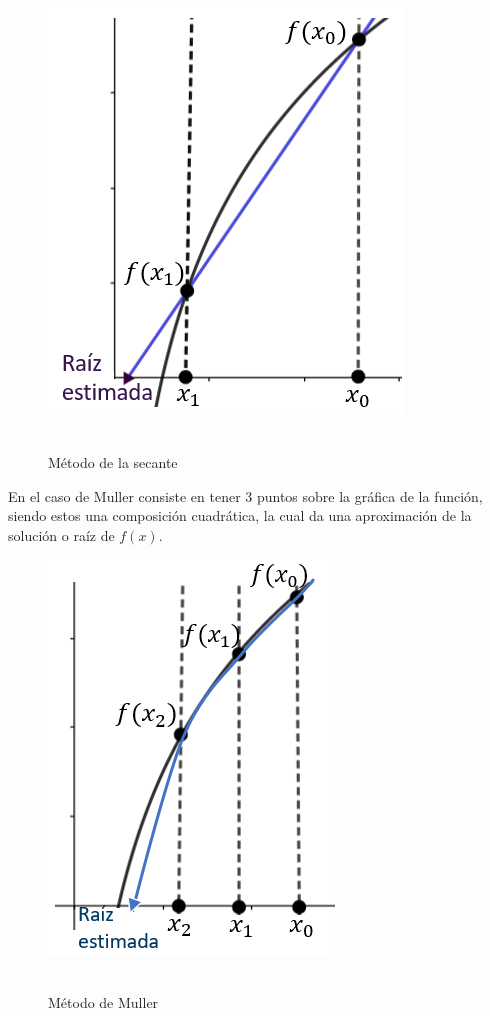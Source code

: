 \documentclass[ceqn,10pt]{SelfArx}
\begin{document}
\begin{figure}[ht]\centering
	\includegraphics[scale=0.5]{GrafSecante.png}\\\ 
	\caption{Método de la secante}
	\label{fig:secante}
\end{figure}
En el caso de Muller consiste en tener 3 puntos 
sobre la gráfica de la función, siendo estos una 
composición cuadrática, la cual da una aproximación 
de la solución o raíz de $f(x)$.
\begin{figure}[ht]\centering
	\includegraphics[scale=0.5]{GrafMuller.png}\\\
	
	\caption{Método de Muller}
	\label{fig:muller}
\end{figure}
\end{document}
